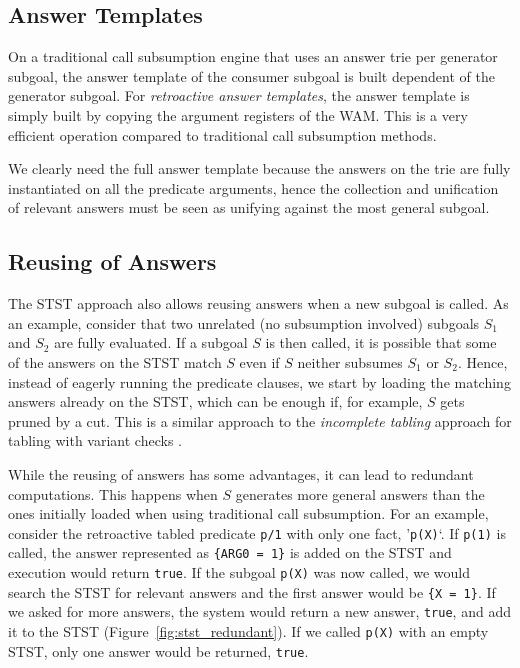 \subsection{Answer Templates}

On a traditional call subsumption engine that uses an answer trie per generator subgoal,
the answer template of the consumer subgoal is built dependent of the generator subgoal.
For \textit{retroactive answer templates}, the answer template is simply built by copying
the argument registers of the WAM. This is a very efficient operation compared to traditional
call subsumption methods.

We clearly need the full answer template because the answers on the trie are fully
instantiated on all the predicate arguments, hence the collection and unification of
relevant answers must be seen as unifying against the most general subgoal.

\subsection{Reusing of Answers}

The STST approach also allows reusing answers when a new subgoal is called.
As an example, consider that two unrelated (no subsumption involved) subgoals $S_1$
and $S_2$ are fully evaluated. If a subgoal $S$ is then called, it is possible
that some of the answers on the STST match $S$ even if $S$ neither subsumes
$S_1$ or $S_2$. Hence, instead of eagerly running the predicate clauses, we start
by loading the matching answers already on the STST, which can be enough if,
for example, $S$ gets pruned by a cut. This is a similar approach to the \textit{incomplete
tabling} approach for tabling with variant checks \cite{Rocha-06a}.

While the reusing of answers has some advantages, it can lead to redundant computations.
This happens when $S$ generates more general answers than the ones initially
loaded when using traditional call subsumption. For an example, consider the retroactive
tabled predicate \texttt{p/1} with only one fact, '\texttt{p(X)}`. If \texttt{p(1)} is
called, the answer represented as \texttt{\{ARG0~=~1\}} is added on the STST and execution
would return \texttt{true}. If the subgoal \texttt{p(X)} was now called, we would search
the STST for relevant answers and the first answer would be \texttt{\{X~=~1\}}. If we
asked for more answers, the system would return a new answer, \texttt{true}, and add it
to the STST (Figure~\ref{fig:stst_redundant}). If we called
\texttt{p(X)} with an empty STST, only one answer would be returned, \texttt{true}.

